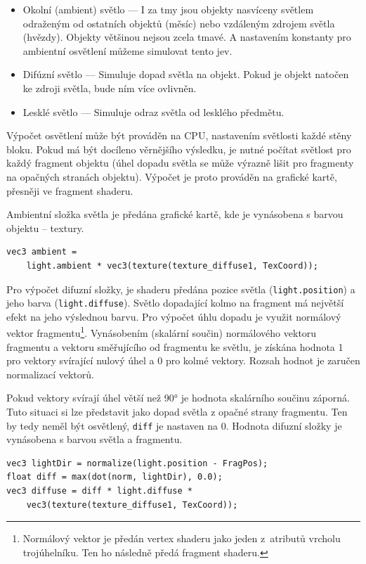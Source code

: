 \documentclass[thesis=M,czech]{FITthesis}[2019/12/23]
\begin{document}
\begin{itemize}
\item Okolní (ambient) světlo --- I za tmy jsou objekty nasvíceny světlem odraženým od ostatních objektů (měsíc) nebo vzdáleným zdrojem světla (hvězdy). Objekty většinou nejsou zcela tmavé. A nastavením konstanty pro ambientní osvětlení můžeme simulovat tento jev.

\item Difúzní světlo --- Simuluje dopad světla na objekt. Pokud je objekt natočen ke zdroji světla, bude ním více ovlivněn. 

\item Lesklé světlo --- Simuluje odraz světla od lesklého předmětu.
\end{itemize}

Výpočet osvětlení může být prováděn na CPU, nastavením světlosti každé stěny bloku. Pokud má být docíleno věrnějšího výsledku, je nutné počítat světlost pro každý fragment objektu (úhel dopadu světla se může výrazně lišit pro fragmenty na opačných stranách objektu). Výpočet je proto prováděn na grafické kartě, přesněji ve fragment shaderu.

Ambientní složka světla je předána grafické kartě, kde je vynásobena s barvou objektu -- textury.

\begin{verbatim}
vec3 ambient = 
    light.ambient * vec3(texture(texture_diffuse1, TexCoord));
\end{verbatim}

Pro výpočet difuzní složky, je shaderu předána pozice světla (\texttt{light.position}) a jeho barva (\texttt{light.diffuse}). Světlo dopadající kolmo na fragment má největší efekt na jeho výslednou barvu. Pro výpočet úhlu dopadu je využit normálový vektor fragmentu\footnote{Normálový vektor je předán vertex shaderu jako jeden z~atributů vrcholu trojúhelníku. Ten ho následně předá fragment shaderu.}. Vynásobením (skalární součin) normálového vektoru fragmentu a vektoru směřujícího od fragmentu ke světlu, je získána hodnota 1 pro vektory svírající nulový úhel a 0 pro kolmé vektory. Rozsah hodnot je zaručen normalizací vektorů.

Pokud vektory svírají úhel větší než 90° je hodnota skalárního součinu záporná. Tuto situaci si lze představit jako dopad světla z opačné strany fragmentu. Ten by tedy neměl být osvětlený, \texttt{diff} je nastaven na 0. Hodnota difuzní složky je vynásobena s barvou světla a fragmentu.

\begin{verbatim}
vec3 lightDir = normalize(light.position - FragPos);
float diff = max(dot(norm, lightDir), 0.0);
vec3 diffuse = diff * light.diffuse * 
    vec3(texture(texture_diffuse1, TexCoord));
\end{verbatim}
\end{document}
